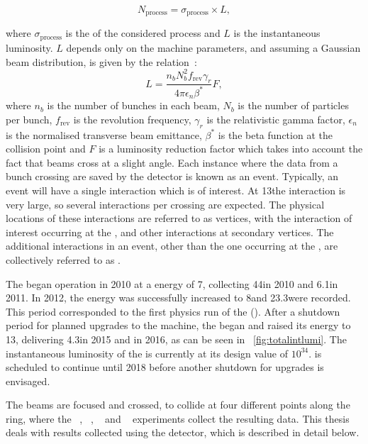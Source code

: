 \begin{equation}
\label{eq:NeqSigmaL}
  N_{\text{process}} = \sigma_{\text{process}}\times L,
\end{equation}

where $\sigma_{\text{process}}$ is the \crosssection of the considered process and $L$ is the instantaneous luminosity. $L$ depends only on the machine parameters, and assuming a Gaussian beam distribution, is given by the relation~\cite{Benedikt:823808}:
\begin{equation}
\label{eq:NeqSigmaL}
  L = \frac{n_{b} N^{2}_{b} f_{\text{rev}} \gamma_{r}}{4 \pi \epsilon_{n} \beta^{*}} F,
\end{equation}
where $n_{b}$ is the number of bunches in each beam, $N_{b}$ is the number of particles per bunch,  $f_{\text{rev}}$ is the revolution frequency,  $\gamma_{r}$ is the relativistic gamma factor, $\epsilon_{n}$ is the normalised transverse beam emittance, $\beta^{*}$ is the beta function at the collision point  and $F$ is a luminosity reduction factor which takes into account the fact that beams cross at a slight angle. Each instance where the data from a bunch crossing are saved by the detector is known as an event. Typically, an event will have a single interaction which is of interest. At 13\TeV the \pp interaction \crosssection is very large, so several interactions per crossing are expected. The physical locations of these interactions are referred to as vertices, with the interaction of interest occurring at the \PV, and other interactions at secondary vertices. The additional interactions in an event, other than the one occurring at the \PV, are collectively referred to as \PU. 

The \LHC began operation in 2010 at a \CoM energy of 7\TeV, collecting 44\ipb in 2010 and 6.1\ifb in 2011. In 2012, the \CoM energy was successfully increased to 8\TeV and 23.3\ifb were recorded. This period corresponded to the first physics run of the \LHC (\RunI). After a shutdown period for planned upgrades to the machine, the \LHC began \RunII and raised its \CoM energy to 13\TeV, delivering 4.3\ifb in 2015 and \totaldatatwentysixteen\ifb in 2016, as can be seen in \Fig~\ref{fig:totalintlumi}. The instantaneous luminosity of the \LHC is currently at its design value of $10^{34}$\lumiunits. \RunII is scheduled to continue until 2018 before another shutdown for upgrades is envisaged. 

The \LHC beams are focused and crossed, to collide at four different points along the ring, where the \ATLAS~\cite{AtlasatLHC}, \CMS~\cite{CMSatLHC}, \ALICE~\cite{AliceatLHC} and \LHCb~\cite{LHCbatLHC} experiments collect the resulting data. This thesis deals with results collected using the \CMS detector, which is described in detail below.

